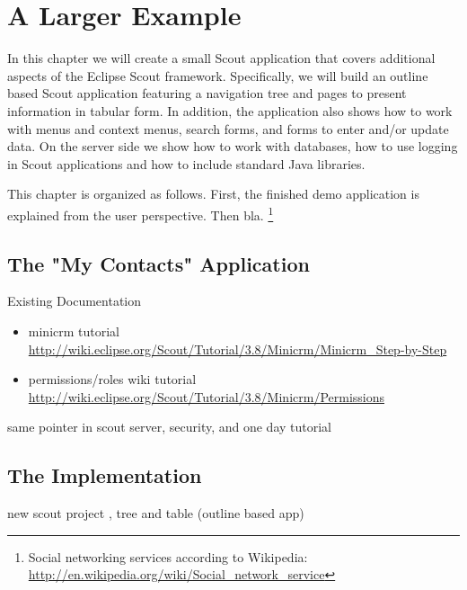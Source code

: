 \documentclass[a4paper,10pt,twoside]{book}
\begin{document}
  \sloppy
\fi

\chapter{A Larger Example}

In this chapter we will create a small Scout application that covers additional aspects of the Eclipse Scout framework. 
Specifically, we will build an outline based Scout application featuring a navigation tree and pages to present information in tabular form. 
In addition, the application also shows how to work with menus and context menus, search forms, and forms to enter and/or update data. 
On the server side we show how to work with databases, how to use logging in Scout applications and how to include standard Java libraries. 

This chapter is organized as follows.
First, the finished demo application is explained from the user perspective.
Then bla.
\footnote{
Social networking services according to Wikipedia: \url{http://en.wikipedia.org/wiki/Social_network_service}
}

\section{The "My Contacts" Application}

\noindent Existing Documentation
\begin{itemize}
  \item minicrm tutorial \url{http://wiki.eclipse.org/Scout/Tutorial/3.8/Minicrm/Minicrm_Step-by-Step}
  \item permissions/roles wiki tutorial \url{http://wiki.eclipse.org/Scout/Tutorial/3.8/Minicrm/Permissions}
\end{itemize}

same pointer in scout server, security, and one day tutorial

\section{The Implementation}

new scout project , tree and table (outline based app)
\end{document}
